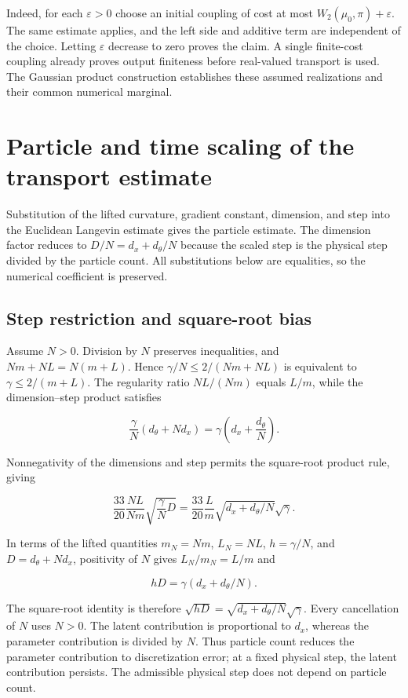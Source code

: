 \documentclass[11pt,a4paper]{article}
\begin{document}
Indeed, for each \(\varepsilon>0\) choose an initial coupling of cost at most \(W_2(\mu_0,\pi)+\varepsilon\). The same estimate applies, and the left side and additive term are independent of the choice. Letting \(\varepsilon\) decrease to zero proves the claim. A single finite-cost coupling already proves output finiteness before real-valued transport is used. The Gaussian product construction establishes these assumed realizations and their common numerical marginal.



\section{\texorpdfstring{Particle and time scaling of the transport estimate}{Particle and time scaling of the transport estimate}}


Substitution of the lifted curvature, gradient constant, dimension, and step into the Euclidean Langevin estimate gives the particle estimate. The dimension factor reduces to \(D/N=d_x+d_\theta/N\) because the scaled step is the physical step divided by the particle count. All substitutions below are equalities, so the numerical coefficient is preserved.



\subsection{\texorpdfstring{Step restriction and square-root bias}{Step restriction and square-root bias}}


Assume \(N>0\). Division by \(N\) preserves inequalities, and \(Nm+NL=N(m+L)\). Hence \(\gamma/N\le2/(Nm+NL)\) is equivalent to \(\gamma\le2/(m+L)\). The regularity ratio \(NL/(Nm)\) equals \(L/m\), while the dimension–step product satisfies

\[\frac\gamma N(d_\theta+Nd_x)=\gamma\left(d_x+\frac{d_\theta}{N}\right).\]

Nonnegativity of the dimensions and step permits the square-root product rule, giving

\[\frac{33}{20}\frac{NL}{Nm}\sqrt{\frac\gamma N D}=\frac{33}{20}\frac Lm\sqrt{d_x+d_\theta/N}\sqrt\gamma.\]

In terms of the lifted quantities \(m_N=Nm\), \(L_N=NL\), \(h=\gamma/N\), and \(D=d_\theta+Nd_x\), positivity of \(N\) gives \(L_N/m_N=L/m\) and

\[hD=\gamma(d_x+d_\theta/N).\]

The square-root identity is therefore \(\sqrt{hD}=\sqrt{d_x+d_\theta/N}\sqrt\gamma\). Every cancellation of \(N\) uses \(N>0\). The latent contribution is proportional to \(d_x\), whereas the parameter contribution is divided by \(N\). Thus particle count reduces the parameter contribution to discretization error; at a fixed physical step, the latent contribution persists. The admissible physical step does not depend on particle count.
\end{document}
